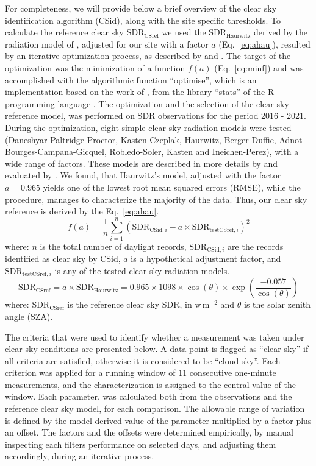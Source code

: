 \documentclass[An awesome
journal,,,moreauthors,pdftex]{Definitions/mdpi}
\begin{document}
For completeness, we will provide below a brief overview of the clear
sky identification algorithm (CSid), along with the site specific
thresholds. To calculate the reference clear sky
\(\text{SDR}_\text{CSref}\) we used the \(\text{SDR}_\text{Haurwitz}\)
derived by the radiation model of \citet{Haurwitz1945}, adjusted for our
site with a factor \(a\) (Eq.~\ref{eq:ahau}), resulted by an iterative
optimization process, as described by \citet{Long2000} and
\citet{Reno2016}. The target of the optimization was the minimization of
a function \(f(a)\) (Eq.~\ref{eq:minf}) and was accomplished with the
algorithmic function ``optimise'', which is an implementation based on
the work of \citet{Brent1973}, from the library ``stats'' of the R
programming language \citep{RCT2023}. The optimization and the selection
of the clear sky reference model, was performed on SDR observations for
the period 2016 - 2021. During the optimization, eight simple clear sky
radiation models were tested (Daneshyar-Paltridge-Proctor,
Kasten-Czeplak, Haurwitz, Berger-Duffie, Adnot-Bourges-Campana-Gicquel,
Robledo-Soler, Kasten and Ineichen-Perez), with a wide range of factors.
These models are described in more details by \citet{Reno2012} and
evaluated by \citet{Reno2016}. We found, that Haurwitz's model, adjusted
with the factor \(a = 0.965\) yields one of the lowest root mean squared
errors (RMSE), while the procedure, manages to characterize the majority
of the data. Thus, our clear sky reference is derived by the
Eq.~\ref{eq:ahau}. \begin{equation}
f(a) = \frac{1}{n}\sum_{i=1}^{n} ( \text{SDR}_{\text{CSid},i} - a \times \text{SDR}_{\text{testCSref},i} )^2 \label{eq:minf}
\end{equation} where: \(n\) is the total number of daylight records,
\(\text{SDR}_{\text{CSid},i}\) are the records identified as clear sky
by CSid, \(a\) is a hypothetical adjustment factor, and
\(\text{SDR}_{\text{testCSref},i}\) is any of the tested clear sky
radiation models. \begin{equation}
\text{SDR}_\text{CSref} = a \times \text{SDR}_\text{Haurwitz} = 0.965 \times 1098 \times \cos(\theta) \times \exp \left( \frac{ - 0.057}{\cos(\theta)} \right) \label{eq:ahau}
\end{equation} where: \(\text{SDR}_\text{CSref}\) is the reference clear
sky SDR, in \(\text{w}\,\text{m}^{-2}\) and \(\theta\) is the solar
zenith angle (SZA).

The criteria that were used to identify whether a measurement was taken
under clear-sky conditions are presented below. A data point is flagged
as ``clear-sky'' if all criteria are satisfied, otherwise it is
considered to be ``cloud-sky''. Each criterion was applied for a running
window of \(11\) consecutive one-minute measurements, and the
characterization is assigned to the central value of the window. Each
parameter, was calculated both from the observations and the reference
clear sky model, for each comparison. The allowable range of variation
is defined by the model-derived value of the parameter multiplied by a
factor plus an offset. The factors and the offsets were determined
empirically, by manual inspecting each filters performance on selected
days, and adjusting them accordingly, during an iterative process.
\end{document}
